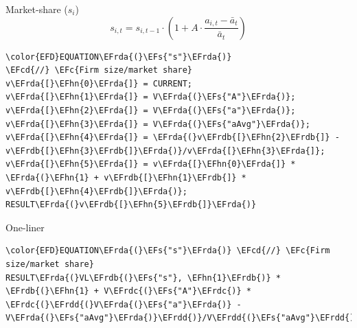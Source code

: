 \documentclass[bigger,aspectratio=169]{beamer}
\newcommand{\EFc}[1]{\textcolor{EFc}{#1}} %
\newcommand{\EFcd}[1]{\textcolor{EFcd}{#1}} %
\newcommand{\EFs}[1]{\textcolor{EFs}{#1}} %
\newcommand{\EFhn}[1]{\textcolor{EFhn}{\textbf{#1}}} %
\newcommand{\EFrda}[1]{\textcolor{EFrda}{#1}} %
\newcommand{\EFrdb}[1]{\textcolor{EFrdb}{#1}} %
\newcommand{\EFrdc}[1]{\textcolor{EFrdc}{#1}} %
\newcommand{\EFrdd}[1]{\textcolor{EFrdd}{#1}} %
\begin{document}
\begin{frame}[label={sec:orgd32040b},fragile]{Market-share (\(s_{i}\))}
 \begin{equation}
s_{i,t} = s_{i,t-1} \cdot \left( 1 + A\cdot\frac{a_{i,t} - \bar{a}_{t}}{\bar{a}_{t}}\right)
\end{equation}


\begin{Code}
\begin{Verbatim}
\color{EFD}EQUATION\EFrda{(}\EFs{"s"}\EFrda{)}
\EFcd{//} \EFc{Firm size/market share}
v\EFrda{[}\EFhn{0}\EFrda{]} = CURRENT;
v\EFrda{[}\EFhn{1}\EFrda{]} = V\EFrda{(}\EFs{"A"}\EFrda{)}; v\EFrda{[}\EFhn{2}\EFrda{]} = V\EFrda{(}\EFs{"a"}\EFrda{)}; v\EFrda{[}\EFhn{3}\EFrda{]} = V\EFrda{(}\EFs{"aAvg"}\EFrda{)};
v\EFrda{[}\EFhn{4}\EFrda{]} = \EFrda{(}v\EFrdb{[}\EFhn{2}\EFrdb{]} - v\EFrdb{[}\EFhn{3}\EFrdb{]}\EFrda{)}/v\EFrda{[}\EFhn{3}\EFrda{]};
v\EFrda{[}\EFhn{5}\EFrda{]} = v\EFrda{[}\EFhn{0}\EFrda{]} * \EFrda{(}\EFhn{1} + v\EFrdb{[}\EFhn{1}\EFrdb{]} * v\EFrdb{[}\EFhn{4}\EFrdb{]}\EFrda{)};
RESULT\EFrda{(}v\EFrdb{[}\EFhn{5}\EFrdb{]}\EFrda{)}
\end{Verbatim}
\end{Code}
\begin{block}{One-liner}
\begin{Code}
\begin{Verbatim}
\color{EFD}EQUATION\EFrda{(}\EFs{"s"}\EFrda{)} \EFcd{//} \EFc{Firm size/market share}
RESULT\EFrda{(}VL\EFrdb{(}\EFs{"s"}, \EFhn{1}\EFrdb{)} * \EFrdb{(}\EFhn{1} + V\EFrdc{(}\EFs{"A"}\EFrdc{)} * \EFrdc{(}\EFrdd{(}V\EFrda{(}\EFs{"a"}\EFrda{)} - V\EFrda{(}\EFs{"aAvg"}\EFrda{)}\EFrdd{)}/V\EFrdd{(}\EFs{"aAvg"}\EFrdd{)}\EFrdc{)}\EFrdb{)}\EFrda{)}
\end{Verbatim}
\end{Code}
\end{block}
\end{frame}
\end{document}
